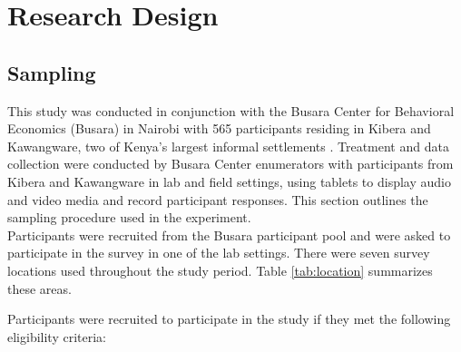 \documentclass[11pt, a4paper]{article}\usepackage[]{graphicx}\usepackage[]{color}
\begin{document}
\section{Research Design}

    \subsection{Sampling}

        This study was conducted in conjunction with the Busara Center for Behavioral Economics (Busara) in Nairobi with 565 participants residing in Kibera and Kawangware, two of Kenya's largest informal settlements \parencite{haushofer_methodology_2014}. Treatment and data collection were conducted by Busara Center enumerators with participants from Kibera and Kawangware in lab and field settings, using tablets to display audio and video media and record participant responses. This section outlines the sampling procedure used in the experiment. \\

        Participants were recruited from the Busara participant pool and were asked to participate in the survey in one of the lab settings. There were seven survey locations used throughout the study period. Table \ref{tab:location} summarizes these areas.

        \begin{table}[h]
        \centering
        \caption{Survey locations}
        \label{tab:location}
        \end{table}

        Participants were recruited to participate in the study if they met the following eligibility criteria:
\end{document}
